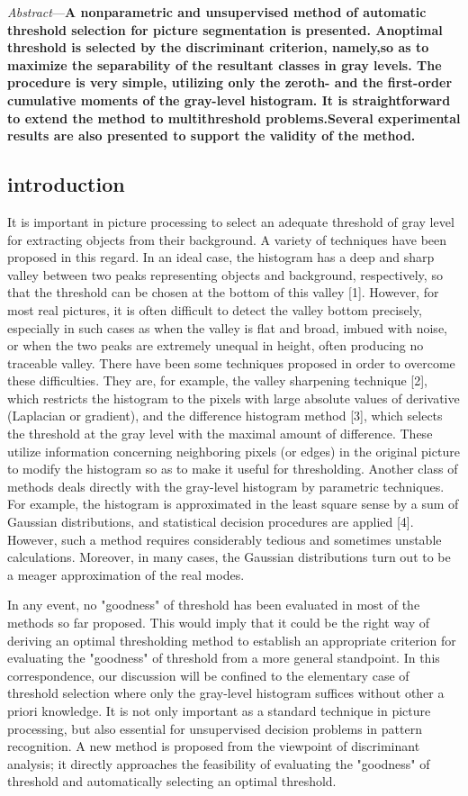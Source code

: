 \textit{Abstract}---\textbf{A nonparametric and unsupervised method of automatic threshold selection for picture segmentation is presented. Anoptimal threshold is selected by the discriminant criterion, namely,so as to maximize the separability of the resultant classes in gray levels. The procedure is very simple, utilizing only the zeroth- and the first-order cumulative moments of the gray-level histogram. It is straightforward to extend the method to multithreshold problems.Several experimental results are also presented to support the validity of the method.}

\subsection*{introduction}

It is important in picture processing to select an adequate threshold of gray level for extracting objects from their background. A variety of techniques have been proposed in this regard. In an ideal case, the histogram has a deep and sharp valley between two peaks representing objects and background, respectively, so that the threshold can be chosen at the bottom of this valley [1]. However, for most real pictures, it is often difficult to detect the valley bottom precisely, especially in such cases as when the valley is flat and broad, imbued with noise, or when the two peaks are extremely unequal in height, often producing no traceable valley. There have been some techniques proposed in order to overcome these difficulties. They are, for example, the valley sharpening technique [2], which restricts the histogram to the pixels with large absolute values of derivative (Laplacian or gradient), and the difference histogram method [3], which selects the threshold at the gray level with the maximal amount of difference. These utilize information concerning neighboring pixels (or edges) in the original picture to modify the histogram so as to make it useful for thresholding. Another class of methods deals directly with the gray-level histogram by parametric techniques. For example, the histogram is approximated in the least square sense by a sum of Gaussian distributions, and statistical decision procedures are applied [4]. However, such a method requires considerably tedious and sometimes unstable calculations. Moreover, in many cases, the Gaussian distributions turn out to be a meager approximation of the real modes.

In any event, no "goodness" of threshold has been evaluated in most of the methods so far proposed. This would imply that it could be the right way of deriving an optimal thresholding method to establish an appropriate criterion for evaluating the "goodness" of threshold from a more general standpoint. In this correspondence, our discussion will be confined to the elementary case of threshold selection where only the gray-level histogram suffices without other a priori knowledge. It is not only important as a standard technique in picture processing, but also essential for unsupervised decision problems in pattern recognition. A new method is proposed from the viewpoint of discriminant analysis; it directly approaches the feasibility of evaluating the "goodness" of threshold and automatically selecting an optimal threshold.

